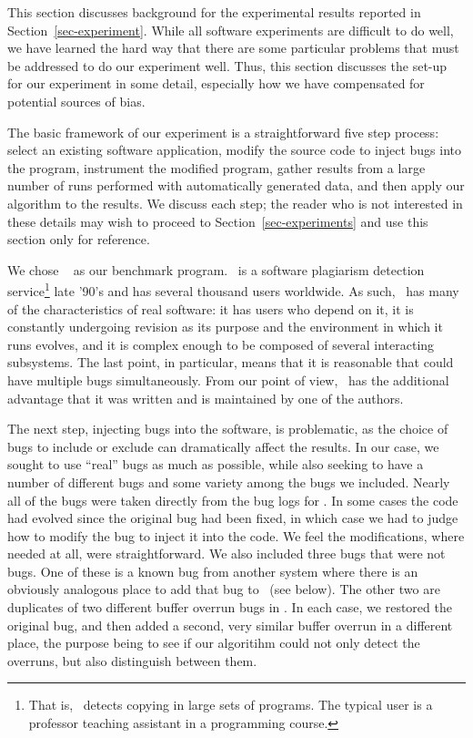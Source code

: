 This section discusses background for the experimental results
reported in Section~\ref{sec-experiment}.  While all software
experiments are difficult to do well, we have learned the hard way
that there are some particular problems that must be addressed to do
our experiment well.  Thus, this section discusses the set-up for our
experiment in some detail, especially how we have compensated for
potential sources of bias. 

The basic framework of our experiment is a straightforward five step
process: select an existing software application, modify the source
code to inject bugs into the program, instrument the modified program,
gather results from a large number of runs performed with
automatically generated data, and then apply our algorithm to the
results.  We discuss each step; the reader who is not interested in
these details may wish to proceed to Section~\ref{sec-experiments} and
use this section only for reference.

We chose \moss\ \cite{SWA03} as our benchmark program.  \moss\ is a
software plagiarism detection service\footnote{That is,
\moss\ detects copying in large sets of programs.  The typical \moss
user is a professor teaching assistant in a programming course.}  late
'90's and has several thousand users worldwide.  As such, \moss\ has
many of the characteristics of real software: it has users who depend
on it, it is constantly undergoing revision as its purpose and the
environment in which it runs evolves, and it is complex enough to be
composed of several interacting subsystems.  The last point, in
particular, means that it is reasonable that \moss could have multiple
bugs simultaneously.  From our point of view, \moss\ has the
additional advantage that it was written and is maintained by one of
the authors.

The next step, injecting bugs into the software, is problematic, as
the choice of bugs to include or exclude can dramatically affect the
results.  In our case, we sought to use ``real'' bugs as much as
possible, while also seeking to have a number of different bugs and
some variety among the bugs we included.  Nearly all of the bugs were
taken directly from the bug logs for \moss.  In some cases the code
had evolved since the original bug had been fixed, in which case we
had to judge how to modify the bug to inject it into the code.  We
feel the modifications, where needed at all, were straightforward.  We
also included three bugs that were not \moss bugs.  One of these is a
known bug from another system where there is an obviously analogous
place to add that bug to \moss\ (see below). The other two are
duplicates of two different buffer overrun bugs in \moss.  In each
case, we restored the original bug, and then added a second, very
similar buffer overrun in a different place, the purpose being to see
if our algoritihm could not only detect the overruns, but also
distinguish between them.

